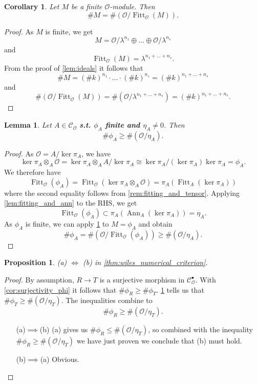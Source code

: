 \documentclass{article}
\theoremstyle{plain}%
\newtheorem{lemma}{Lemma}[section]
\newtheorem{proposition}{Proposition}[section]
\newtheorem{corollary}{Corollary}[section]
\theoremstyle{definition}
\theoremstyle{remark}
\newcommand{\cob}{\mathcal{C}_\mathcal{O}^\bullet}
\newcommand{\co}{\mathcal{C}_\mathcal{O}}
\newcommand{\ann}{\operatorname{Ann}}
\newcommand{\fitt}{\operatorname{Fitt}}
\begin{document}
\begin{corollary}\label{cor:fitting_finite}
    Let \(M\) be a finite \(\mathcal{O}\)-module. Then
    \[
        \# M = \# (\mathcal{O}/\fitt_\mathcal{O}(M)). 
    \]
\end{corollary}
\begin{proof}
    As \(M\) is finite, we get
    \[
        M = \mathcal{O}/\lambda^{n_1} \oplus \dots \oplus \mathcal{O}/\lambda^{n_s}
    \]
    and 
    \[
        \fitt_\mathcal{O}(M) = \lambda^{n_1 + \dots + n_s}.
    \]
    From the proof of \cref{lem:ideals} it follows that
    \[\# M = (\# k)^{n_1} \cdot \dots \cdot (\# k)^{n_s} = (\# k)^{n_1 + \dots + n_s}\]
    and
    \[
        \# (\mathcal{O}/\fitt_\mathcal{O}(M)) = \# (\mathcal{O}/\lambda^{n_1 + \dots + n_s}) = (\# k)^{n_1 + \dots + n_s}.
    \]
\end{proof}

\begin{lemma}\label{lem:standard_ineq}
    Let \(A \in \co\) \textbf{s.t. \(\phi_A\) finite and \(\eta_A \neq 0\)}. Then \[\#\phi_A \geq \#(\mathcal{O}/\eta_A).\]
\end{lemma}
\begin{proof}
    As \(\mathcal{O} = A/\ker \pi_A\), we have
    \[
        \ker \pi_A \otimes_A \mathcal{O} = \ker \pi_A \otimes_A A/\ker \pi_A \cong \ker \pi_A/(\ker \pi_A) \ker \pi_A = \phi_A.
    \]
    We therefore have
    \[
        \fitt_\mathcal{O}(\phi_A) = \fitt_\mathcal{O}(\ker \pi_A \otimes_A\mathcal{O}) = \pi_A(\fitt_A(\ker \pi_A))
    \]
    where the second equality follows from \cref{rem:fitting_and_tensor}.
    Applying \cref{lem:fitting_and_ann} to the RHS, we get 
    \[
        \fitt_\mathcal{O}(\phi_A) \subset \pi_A(\ann_A(\ker \pi_A)) = \eta_A.
    \]
    As \(\phi_A\) is finite, we can apply \cref{cor:fitting_finite} to \(M = \phi_A\) and obtain
    \[
        \# \phi_A = \# (\mathcal{O}/\fitt_\mathcal{O}(\phi_A)) \geq \# (\mathcal{O}/\eta_A).
    \]
\end{proof}

\begin{proposition}
    (a) \(\Leftrightarrow\) (b) in \cref{thm:wiles_numerical_criterion}.
\end{proposition}
\begin{proof}
    By assumption, \(R \to T\) is a surjective morphism in \(\cob\).
    With \cref{cor:surjectivity_phi} it follows that \(\#\phi_R \geq \#\phi_T\).
    \cref{lem:standard_ineq} tells us that \(\#\phi_T \geq \#(\mathcal{O}/\eta_T)\).
    The inequalities combine to \[\#\phi_R \geq \#(\mathcal{O}/\eta_T).\]
    \begin{itemize}
        \item[(a)\(\implies\)(b)] (a) gives us \(\#\phi_R \leq \#(\mathcal{O}/\eta_T)\), so combined with the 
        inequality \(\#\phi_R \geq \#(\mathcal{O}/\eta_T)\) we have just proven we conclude that (b) must hold.
        \item[(b)\(\implies\)(a)] Obvious.
    \end{itemize}      
\end{proof}
\end{document}
